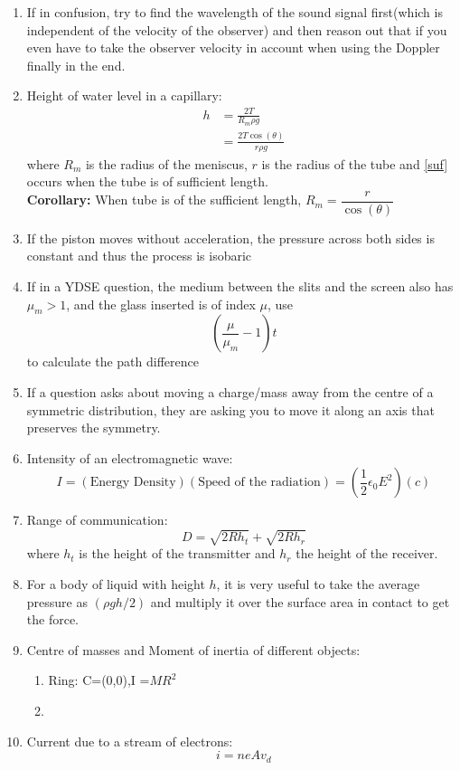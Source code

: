 \documentclass{article}
\numberwithin{equation}{section}
\numberwithin{figure}{section}
\begin{document}
\begin{enumerate}
	\item If in confusion, try to find the wavelength of the sound signal first(which is independent of the velocity of the observer) and then reason out that if you even have to take the observer velocity in account when using the Doppler finally in the end.
	\item Height of water level in a capillary:
		\begin{align}
			h&=\frac{2T}{R_m \rho g}\\
			&=\frac{2T\cos(\theta)}{r \rho g}\label{suf}
		\end{align}
		where $R_m$ is the radius of the meniscus, $r$ is the radius of the tube  and \ref{suf} occurs when the tube is of sufficient length.\\
		\textbf{Corollary:} When tube is of the sufficient length, $R_m=\dfrac{r}{\cos(\theta)}$ 
	\item If the piston moves without acceleration, the pressure across both sides is constant and thus the process is isobaric
	\item If in a YDSE question, the medium between the slits and the screen also has $\mu_{m}>1$, and the glass inserted is of index $\mu$, use $$\left(\dfrac{\mu}{\mu_m}-1\right)t$$ to calculate the path difference
	\item If a question asks about moving a charge/mass away from the centre of a symmetric distribution, they are asking you to move it along an axis that preserves the symmetry.
	\item Intensity of an electromagnetic wave:
		\begin{equation}
			I=(\text{Energy Density})(\text{Speed of the radiation})=\left(\frac{1}{2}\epsilon_0 E^2\right)(c)
		\end{equation}
	\item Range of communication:
		\begin{equation}
			D=\sqrt{2R h_{t}}+\sqrt{2R h_{r}}
		\end{equation}
		where $h_t$ is the height of the transmitter and $h_r$ the height of the receiver.
	\item For a body of liquid with height $h$, it is very useful to take the average pressure as $(\rho gh/2)$ and multiply it over the surface area in contact to get the force.
	\item Centre of masses and Moment of inertia of different objects:
		\begin{enumerate}
			\item Ring: C=(0,0),I =$MR^2$
			\item
		\end{enumerate}
	\item Current due to a stream of electrons:
		\begin{equation}
			i=ne A v_{d}	
		\end{equation}
\end{enumerate}
\end{document}
